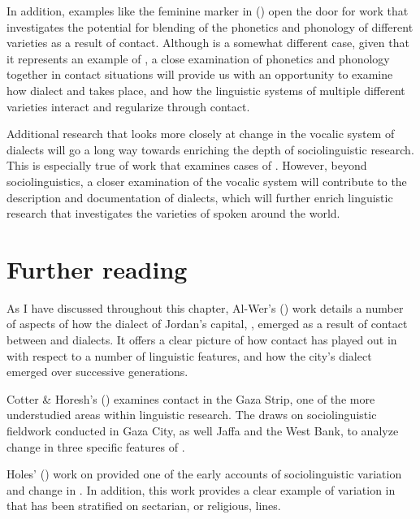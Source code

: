 \documentclass[output=paper]{langsci/langscibook}
\begin{document}
  In addition, examples like the feminine  marker in  (\citealt{Al-Wer2007}) open the door for  work that investigates the potential for blending of the phonetics and phonology of different  varieties as a result of contact. Although  is a somewhat different case, given that it represents an example of  , a close examination of phonetics and phonology together in contact situations will provide us with an opportunity to examine how dialect  and  takes place, and how the linguistic systems of multiple different  varieties interact and regularize through contact. 

  Additional research that looks more closely at change in the vocalic system of  dialects will go a long way towards enriching the depth of  sociolinguistic research. This is especially true of work that examines cases of . However, beyond sociolinguistics, a closer examination of the vocalic system will contribute to the description and documentation of  dialects, which will further enrich linguistic research that investigates the varieties of  spoken around the world. 

\section*{Further reading}

As I have discussed throughout this chapter, Al-Wer's (\citeyear{Al-Wer2007}) work details a number of aspects of how the dialect of Jordan’s capital, , emerged as a result of contact between  and  dialects. It offers a clear picture of how contact has played out in  with respect to a number of linguistic features, and how the city’s dialect emerged over successive generations. 

Cotter \& Horesh’s (\citeyear{CotterHoresh2015})  examines contact in the Gaza Strip, one of the more understudied areas within  linguistic research. The  draws on sociolinguistic fieldwork conducted in Gaza City, as well Jaffa and the West Bank, to analyze change in three specific features of  .

Holes' (\citeyear{Holes1987}) work on  provided one of the early accounts of sociolinguistic variation and change in . In addition, this work provides a clear example of variation in  that has been stratified on sectarian, or religious, lines. 
\end{document}
